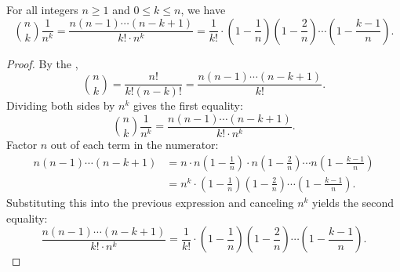 \begin{lemma} \label{lemma:binomial_coefficient_n_choose_k_over_n_pow_k_product_expansion}
    For all integers $n \geq 1$ and $0 \leq k \leq n$, we have
    $$\binom{n}{k} \frac{1}{n^k} = \frac{n(n-1)\cdots(n-k+1)}{k! \cdot n^k} = \frac{1}{k!} \cdot \left(1 - \frac{1}{n}\right) \left(1 - \frac{2}{n}\right) \cdots \left(1 - \frac{k-1}{n}\right).$$
\end{lemma}
\begin{proof}
    By the ,
    $$\binom{n}{k} = \frac{n!}{k!(n-k)!} = \frac{n(n-1)\cdots(n-k+1)}{k!}.$$
    Dividing both sides by $n^k$ gives the first equality:
    $$\binom{n}{k} \frac{1}{n^k} = \frac{n(n-1)\cdots(n-k+1)}{k! \cdot n^k}.$$
    Factor $n$ out of each term in the numerator:
    \begin{align*}
    n(n-1)\cdots(n-k+1) &= n \cdot n\left(1 - \frac{1}{n}\right) \cdot n\left(1 - \frac{2}{n}\right) \cdots n\left(1 - \frac{k-1}{n}\right) \\
    &= n^k \cdot \left(1 - \frac{1}{n}\right) \left(1 - \frac{2}{n}\right) \cdots \left(1 - \frac{k-1}{n}\right).
    \end{align*}
    Substituting this into the previous expression and canceling $n^k$ yields the second equality:
    $$\frac{n(n-1)\cdots(n-k+1)}{k! \cdot n^k} = \frac{1}{k!} \cdot \left(1 - \frac{1}{n}\right) \left(1 - \frac{2}{n}\right) \cdots \left(1 - \frac{k-1}{n}\right).$$
\end{proof}